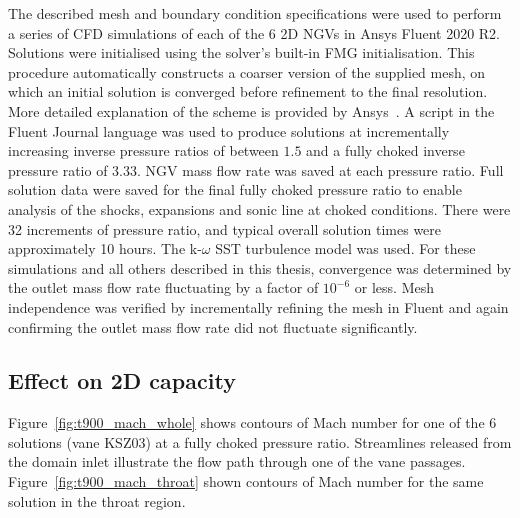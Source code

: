 \documentclass[a4paper, 11pt, oneside]{report}
\begin{document}
The described mesh and boundary condition specifications were used to perform a series of CFD simulations of each of the 6 2D NGVs in Ansys Fluent 2020 R2. Solutions were initialised using the solver's built-in FMG initialisation. This procedure automatically constructs a coarser version of the supplied mesh, on which an initial solution is converged before refinement to the final resolution. More detailed explanation of the scheme is provided by Ansys~\cite{ansys_fmg_initialisation}. A script in the Fluent Journal language was used to produce solutions at incrementally increasing inverse pressure ratios of between $1.5$ and a fully choked inverse pressure ratio of $3.33$. NGV mass flow rate was saved at each pressure ratio. Full solution data were saved for the final fully choked pressure ratio to enable analysis of the shocks, expansions and sonic line at choked conditions. There were 32 increments of pressure ratio, and typical overall solution times were approximately 10 hours. The k-$\omega$ SST turbulence model was used. For these simulations and all others described in this thesis, convergence was determined by the outlet mass flow rate fluctuating by a factor of $10^{-6}$ or less. Mesh independence was verified by incrementally refining the mesh in Fluent and again confirming the outlet mass flow rate did not fluctuate significantly.

\subsection{Effect on 2D capacity}

Figure~\ref{fig:t900_mach_whole} shows contours of Mach number for one of the 6 solutions (vane KSZ03) at a fully choked pressure ratio. Streamlines released from the domain inlet illustrate the flow path through one of the vane passages. Figure~\ref{fig:t900_mach_throat} shown contours of Mach number for the same solution in the throat region.
\end{document}
